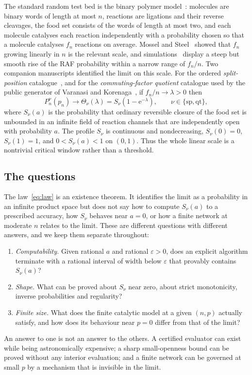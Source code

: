 \documentclass[11pt,a4paper]{article}
\theoremstyle{plain}
\theoremstyle{definition}
\theoremstyle{remark}
\newcommand{\qt}{\mathrm{qt}}
\newcommand{\spc}{\mathrm{sp}}
\newcommand{\eps}{\varepsilon}
\newcommand{\ee}{\mathrm{e}}
\begin{document}
The standard random test bed is the binary polymer model~\cite{kauffman1986autocatalytic,steel2000emergence,hordijk2004detecting}: molecules are binary words of length at most $n$, reactions are ligations and their reverse cleavages, the food set consists of the words of length at most two, and each molecule catalyses each reaction independently with a probability chosen so that a molecule catalyses $f_n$ reactions on average. Mossel and Steel~\cite{mossel2005random} showed that $f_n$ growing linearly in $n$ is the relevant scale, and simulations~\cite{hordijk2011required,hordijk2016variable,hordijk2019diversity} display a steep but smooth rise of the RAF probability within a narrow range of $f_n/n$. Two companion manuscripts identified the limit on this scale. For the ordered \emph{split-position} catalogue~\cite{splitwindow2026}, and for the \emph{commuting-factor quotient} catalogue used by the public generator of Varanasi and Korenaga~\cite{varanasi2026emergence,varanasi2026repository,overlapgateway2026,quotientwindow2026}, if $f_n/n\to\lambda>0$ then
\begin{equation}\label{eq:law}
P_n^\nu(p_n)\longrightarrow\Theta_\nu(\lambda)=S_\nu(1-\ee^{-\lambda}),\qquad \nu\in\{\spc,\qt\},
\end{equation}
where $S_\nu(a)$ is the probability that ordinary reversible closure of the food set is unbounded in an infinite field of reaction channels that are independently open with probability $a$. The profile $S_\nu$ is continuous and nondecreasing, $S_\nu(0)=0$, $S_\nu(1)=1$, and $0<S_\nu(a)<1$ on $(0,1)$. Thus the whole linear scale is a nontrivial critical window rather than a threshold.

\subsection*{The questions}
The law~\eqref{eq:law} is an existence theorem. It identifies the limit as a probability in an infinite product space but does not say how to compute $S_\nu(a)$ to a prescribed accuracy, how $S_\nu$ behaves near $a=0$, or how a finite network at moderate $n$ relates to the limit. These are different questions with different answers, and we keep them separate throughout:
\begin{enumerate}[label=(Q\arabic*),leftmargin=3em]
\item \emph{Computability.} Given rational $a$ and rational $\eps>0$, does an explicit algorithm terminate with a rational interval of width below $\eps$ that provably contains $S_\nu(a)$?
\item \emph{Shape.} What can be proved about $S_\nu$ near zero, about strict monotonicity, inverse probabilities and regularity?
\item \emph{Finite size.} What does the finite catalytic model at a given $(n,p)$ actually satisfy, and how does its behaviour near $p=0$ differ from that of the limit?
\end{enumerate}
An answer to one is not an answer to the others. A certified evaluator can exist while being astronomically expensive; a sharp small-openness bound can be proved without any interior evaluation; and a finite network can be governed at small $p$ by a mechanism that is invisible in the limit.
\end{document}
